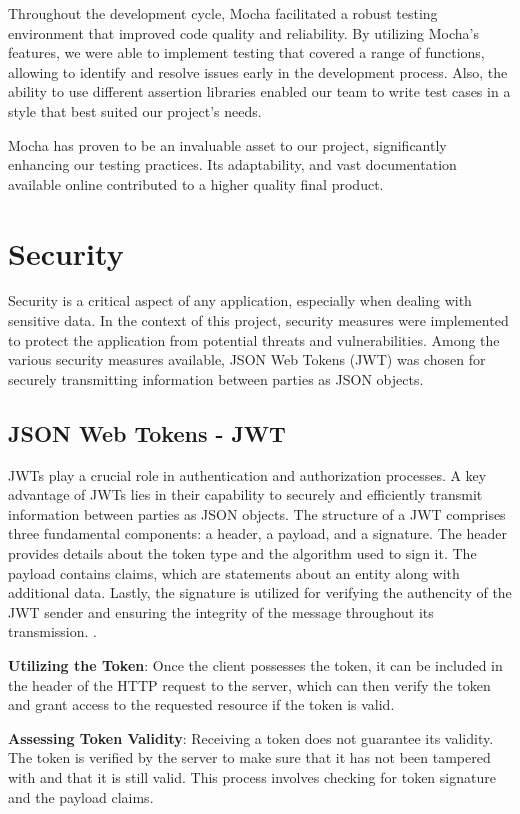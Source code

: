 Throughout the development cycle, Mocha facilitated a robust testing environment that improved code quality and reliability. By utilizing Mocha's features, we were able to 
implement testing that covered a range of functions, allowing to identify and resolve issues early in the development process. 
Also, the ability to use different assertion libraries enabled our team to write test cases in a style that best suited our project's needs.

Mocha has proven to be an invaluable asset to our project, significantly enhancing our testing practices. Its adaptability, and vast documentation available online contributed 
to a higher quality final product.



\section{Security}
Security is a critical aspect of any application, especially when dealing with sensitive data. In the context of this project, security measures were implemented 
to protect the application from potential threats and vulnerabilities. Among the various security measures available, JSON Web Tokens (JWT) was chosen for securely
transmitting information between parties as JSON objects. 

\subsection{JSON Web Tokens - JWT}

JWTs play a crucial role in authentication and authorization processes. A key advantage of JWTs lies in their capability to securely and efficiently transmit information
between parties as JSON objects. 
The structure of a JWT comprises three fundamental components: a header, a payload, and a signature. The header provides details about the token type and the algorithm used to sign it.
The payload contains claims, which are statements about an entity along with additional data. Lastly, the signature is utilized for verifying the authencity of the JWT sender
and ensuring the integrity of the message throughout its transmission. \cite{jwt}.

\textbf{Utilizing the Token}: Once the client possesses the token, it can be included in the header of the HTTP request to the server, which can then verify 
the token and grant access to the requested resource if the token is valid.

\textbf{Assessing Token Validity}: Receiving a token does not guarantee its validity. The token is verified by the server to make sure that it has not been tampered with
and that it is still valid. This process involves checking for token signature and the payload claims. 

